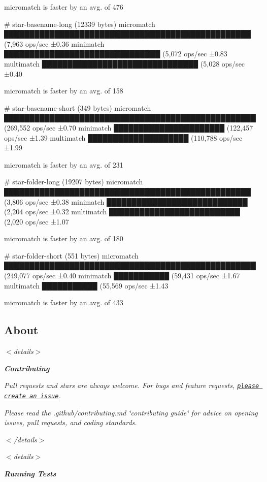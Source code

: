 {\begin{DoxyCode}
  micromatch is faster by an avg. of 476%

# star-basename-long (12339 bytes)
  micromatch █████████████████████████████████████████████████ (7,963 ops/sec ±0.36%
  minimatch  ███████████████████████████████ (5,072 ops/sec ±0.83%
  multimatch ███████████████████████████████ (5,028 ops/sec ±0.40%

  micromatch is faster by an avg. of 158%

# star-basename-short (349 bytes)
  micromatch ██████████████████████████████████████████████████ (269,552 ops/sec ±0.70%
  minimatch  ██████████████████████ (122,457 ops/sec ±1.39%
  multimatch ████████████████████ (110,788 ops/sec ±1.99%

  micromatch is faster by an avg. of 231%

# star-folder-long (19207 bytes)
  micromatch █████████████████████████████████████████████████ (3,806 ops/sec ±0.38%
  minimatch  ████████████████████████████ (2,204 ops/sec ±0.32%
  multimatch ██████████████████████████ (2,020 ops/sec ±1.07%

  micromatch is faster by an avg. of 180%

# star-folder-short (551 bytes)
  micromatch ██████████████████████████████████████████████████ (249,077 ops/sec ±0.40%
  minimatch  ███████████ (59,431 ops/sec ±1.67%
  multimatch ███████████ (55,569 ops/sec ±1.43%

  micromatch is faster by an avg. of 433%
\end{DoxyCode}
}

{\itshape \subsection*{About}}

{\itshape }

{\itshape $<$details$>$ }

{\itshape {\bfseries Contributing}}

{\itshape }

{\itshape Pull requests and stars are always welcome. For bugs and feature requests, \href{../../issues/new}{\tt please create an issue}.}

{\itshape Please read the .github/contributing.\+md \char`\"{}contributing guide\char`\"{} for advice on opening issues, pull requests, and coding standards.}

{\itshape $<$/details$>$}

{\itshape $<$details$>$ }

{\itshape {\bfseries Running Tests}}

